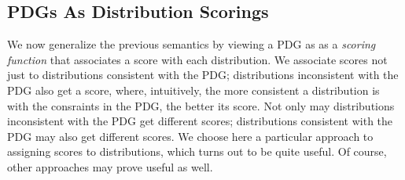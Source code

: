 \documentclass{article}
\numberwithin{equation}{section}
\begin{document}
	\subsection{PDGs As Distribution
          Scorings} \label{sec:weighted-semantics}  
	We now generalize the previous semantics by viewing a PDG as
as a \emph{scoring function} that associates a score with each distribution.
We associate scores not just to distributions consistent with the PDG;
distributions inconsistent with the PDG also get a score, where,
intuitively, the more consistent a distribution is with the consraints
in the PDG, the better its score.  Not only may distributions
inconsistent with the PDG get different scores; distributions
consistent with the PDG may also get different scores.  We choose here
a particular approach to assigning scores to distributions, which
turns out to be quite useful.  Of course, other approaches may   prove
useful as well.
\end{document}
